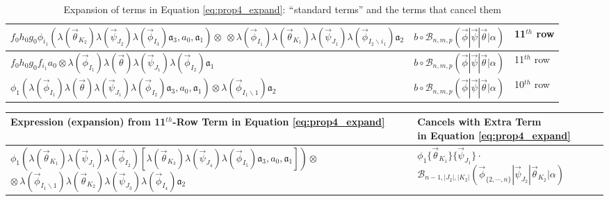 \begin{landscape}
\begin{center}
\begin{table}
\begin{tabular}{ p{3.8in} | p{1.5in} | p{2.2in} }
    \breakcell{$f_0h_0g_0 \phi_{i_1} ( \lambda(\vec{\theta}_{K_2}) \lambda(\vec{\psi}_{J_2}) \lambda(\vec{\phi}_{I_3})
       \mathfrak{a}_3, a_0, \mathfrak{a}_1) \otimes$\\
       $\otimes \, 
       \lambda(\vec{\phi}_{I_1}) \lambda(\vec{\theta}_{K_1}) \lambda(\vec{\psi}_{J_1}) 
       \lambda(\vec{\phi}_{I_2 \backslash i_1}) \mathfrak{a}_2$} &
    $b \circ \mathcal{B}_{n,m,p} (\vec{\phi} | \vec{\psi} | \vec{\theta} | \alpha)$ & 
    11$^{th}$ row \\ \hline

    $f_0h_0g_0f_{i_1}a_0 \otimes \lambda(\vec{\phi}_{I_1}) \lambda(\vec{\theta}) 
       \lambda(\vec{\psi}_{J_1}) \lambda(\vec{\phi}_{I_2}) \mathfrak{a}_1$ &
    $b \circ \mathcal{B}_{n,m,p} (\vec{\phi} | \vec{\psi} | \vec{\theta} | \alpha)$ & 
    11$^{th}$ row \\ \hline

    $\phi_1( \lambda(\vec{\phi}_{I_1}) \lambda(\vec{\theta}) 
       \lambda(\vec{\psi}_{J_1}) \lambda(\vec{\phi}_{I_2}) \mathfrak{a}_3, a_0, \mathfrak{a}_1 ) \otimes
       \lambda(\vec{\phi}_{I_1 \backslash 1}) \mathfrak{a}_2$ &
    $b \circ \mathcal{B}_{n,m,p} (\vec{\phi} | \vec{\psi} | \vec{\theta} | \alpha)$ & 
    10$^{th}$ row \\ \hline

  \end{tabular}
\caption{Expansion of terms in Equation \ref{eq:prop4_expand}: 
$``$standard terms'' and the 
terms that cancel them}
\label{table:t41}
\end{table}  
\end{center}
%
%
\begin{center}
\begin{table}
  \begin{tabular}{ p{5.3in} | p{2.2in} }
    \hline
    Expression (expansion) from 11$^{th}$-Row Term in Equation \ref{eq:prop4_expand} & 
    \breakcell{Cancels with Extra Term\\in Equation \ref{eq:prop4_expand}} \\ \hline
    \breakcell{$\phi_1(\lambda(\vec{\theta}_{K_1}) \lambda(\vec{\psi}_{J_1}) \lambda(\vec{\phi}_{I_2}) [
      \lambda(\vec{\theta}_{K_3}) \lambda(\vec{\psi}_{J_4}) \lambda(\vec{\phi}_{I_5})
      \mathfrak{a}_3, a_0, \mathfrak{a}_1]) \otimes$\\
      $\otimes\, \lambda(\vec{\phi}_{I_1\backslash 1}) \lambda(\vec{\theta}_{K_2}) 
      \lambda(\vec{\psi}_{J_3}) \lambda(\vec{\phi}_{I_4}) \mathfrak{a}_2$} &
    \breakcell{$\phi_1 \{\vec{\theta}_{K_1}\} \{\vec{\psi}_{J_1}\} \cdot$\\
     $\mathcal{B}_{n-1, |J_2|, |K_2|}
     (\vec{\phi}_{\{2,\cdots,n\}} | \vec{\psi}_{J_2} | \vec{\theta}_{K_2} | \alpha)$} \\ \hline


\end{tabular}
\end{table}
\end{center}
\end{landscape}
